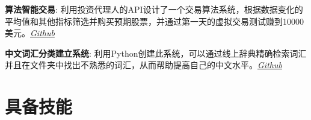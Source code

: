 \documentclass[margin]{res}
\begin{document}
\begin{CJK*}{UTF8}{gbsn}
\begin{resume}
\par
\textbf{算法智能交易}:
利用投资代理人的API设计了一个交易算法系统，根据数据变化的平均值和其他指标筛选并购买预期股票，并通过第一天的虚拟交易测试赚到10000美元。\textit{\href{https://github.com/lucaskjaero/Algorithmic-Trading-API}{Github}}


\par
\textbf{中文词汇分类建立系统}:
利用Python创建此系统，可以通过线上辞典精确检索词汇并且在文件夹中找出不熟悉的词汇，从而帮助提高自己的中文水平。\textit{\href{https://github.com/lucaskjaero/Chinese-Vocabulary-Finder}{Github}}




\section{具备技能}


\end{resume}
\end{CJK*}
\end{document}
